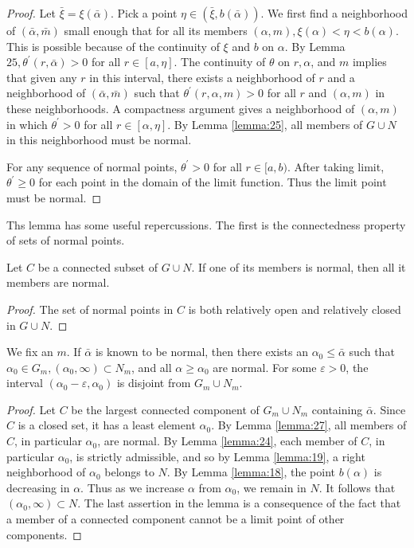 \begin{proof}
  Let $\bar{\xi}=\xi(\bar{\alpha})$. Pick a point $\eta \in(\bar{\xi}, b(\bar{\alpha}))$.
  We first find a neighborhood of $(\bar{\alpha}, \bar{m})$ small enough that
  for all its members $(\alpha, m), \xi(\alpha)<\eta<b(\alpha)$.
  This is possible because of the continuity of $\xi$ and $b$ on $\alpha$.
  By Lemma $25, \theta^{\prime}(r, \bar{\alpha})>0$ for all $r \in[a, \eta]$.
  The continuity of $\theta$ on $r, \alpha$, and $m$ implies that given any $r$ in this 
  interval, there exists a neighborhood of $r$ and a neighborhood
  of $(\bar{\alpha}, \bar{m})$ such that $\theta^{\prime}(r, \alpha, m)>0$
  for all $r$ and $(\alpha, m)$ in these neighborhoods.
  A compactness argument gives a neighborhood of $(\alpha, m)$
  in which $\theta^{\prime}>0$ for all $r \in[\alpha, \eta]$.
  By Lemma \ref{lemma:25}, all members of $G \cup N$ in this neighborhood must be normal.

  For any sequence of normal points, $\theta^{\prime}>0$ for all $r \in[a, b)$.
  After taking limit, $\theta^{\prime} \geq 0$ for each point in the
  domain of the limit function. Thus the limit point must be normal.
\end{proof}

Ths lemma has some useful repercussions.
The first is the connectedness property of sets of normal points.

\begin{lemma}\label{lemma:27}
  Let $C$ be a connected subset of $G \cup N$. If one of its members is normal,
  then all it members are normal.
\end{lemma}

\begin{proof}
  The set of normal points in $C$ is both relatively open and relatively closed in $G \cup N$.
\end{proof}

\begin{lemma}\label{lemma:28}
  We fix an $m$. If $\bar{\alpha}$ is known to be normal,
  then there exists an $\alpha_0 \leq \bar{\alpha}$ such that
  $\alpha_0 \in G_m,\left(\alpha_0, \infty\right) \subset N_m$,
  and all $\alpha \geq \alpha_0$ are normal. For some $\varepsilon>0$,
  the interval $\left(\alpha_0-\varepsilon, \alpha_0\right)$ is disjoint from $G_m \cup N_m$.
\end{lemma}

\begin{proof}
  Let $C$ be the largest connected component of $G_m \cup N_m$ containing $\bar{\alpha}$.
  Since $C$ is a closed set, it has a least element $\alpha_0$.
  By Lemma \ref{lemma:27}, all members of $C$, in particular $\alpha_0$, are normal.
  By Lemma \ref{lemma:24}, each member of $C$, in particular $\alpha_0$, is strictly admissible,
  and so by Lemma \ref{lemma:19}, a right neighborhood of $\alpha_0$ belongs to $N$.
  By Lemma \ref{lemma:18}, the point $b(\alpha)$ is decreasing in $\alpha$.
  Thus as we increase $\alpha$ from $\alpha_0$, we remain in $N$.
  It follows that $\left(\alpha_0, \infty\right) \subset N$.
  The last assertion in the lemma is a consequence of the fact that
  a member of a connected component cannot be a limit point of other components.
\end{proof}

